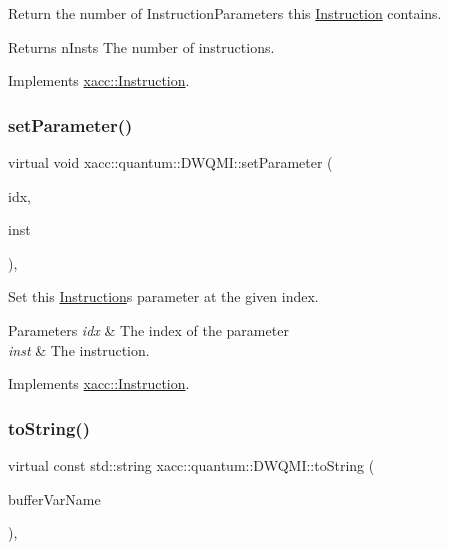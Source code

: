 Return the number of Instruction\+Parameters this \hyperlink{a01155}{Instruction} contains.

\begin{DoxyReturn}{Returns}
n\+Insts The number of instructions. 
\end{DoxyReturn}


Implements \hyperlink{a01155_ad54585d13c04ffd20296fff7ab8107ff}{xacc\+::\+Instruction}.

\mbox{\label{a00987_a194b5b9f58262774fde0285f4c3f60af}} 
\subsubsection{\texorpdfstring{set\+Parameter()}{setParameter()}}
{\footnotesize\ttfamily virtual void xacc\+::quantum\+::\+D\+W\+Q\+M\+I\+::set\+Parameter (\begin{DoxyParamCaption}\item[{const int}]{idx,  }\item[{Instruction\+Parameter \&}]{inst }\end{DoxyParamCaption})\hspace{0.3cm}{\ttfamily [inline]}, {\ttfamily [virtual]}}

Set this \hyperlink{a01155}{Instruction}\textquotesingle{}s parameter at the given index.


\begin{DoxyParams}{Parameters}
{\em idx} & The index of the parameter \\
\hline
{\em inst} & The instruction. \\
\hline
\end{DoxyParams}


Implements \hyperlink{a01155_a407a0ac662fa0b1ec3e301e8ff9bade7}{xacc\+::\+Instruction}.

\mbox{\label{a00987_a8d8742bb6743cf6e49f95966d05bbec2}} 
\subsubsection{\texorpdfstring{to\+String()}{toString()}}
{\footnotesize\ttfamily virtual const std\+::string xacc\+::quantum\+::\+D\+W\+Q\+M\+I\+::to\+String (\begin{DoxyParamCaption}\item[{const std\+::string \&}]{buffer\+Var\+Name }\end{DoxyParamCaption})\hspace{0.3cm}{\ttfamily [inline]}, {\ttfamily [virtual]}}

